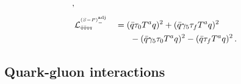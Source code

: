 \documentclass[aps,twocolumn,prd,superscriptaddress]{revtex4-2}
\begin{document}
\begin{alignat}{2}
	\,,\notag                                                                                                                                                                             \\[1ex]
	 & \mathcal{L}_{\scriptscriptstyle\bar q\bar qqq}^{\scriptscriptstyle(S-P)_-^\text{adj}} &  & = (\bar{q} \tau_0 T^a q)^2 + (\bar{q}\gamma_5 \tau_f T^a q)^2
	\notag                                                                                                                                                                                \\&&&\hspace{4ex} - (\bar q \gamma_5 \tau_0 T^a q )^2 - (\bar q \tau_f T^a q )^2\,.
\end{alignat}
%


\subsection{Quark-gluon interactions}
\label{app:quarkGluonBasis}
\end{document}
